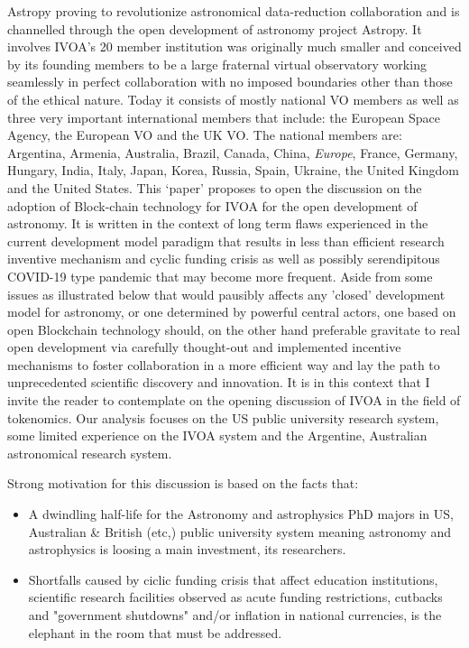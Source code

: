 \documentclass[final,5p,times,twocolumn,authoryear]{elsarticle}
\begin{document}
Astropy proving to revolutionize astronomical data-reduction collaboration and is channelled through the open development of astronomy project Astropy. It involves IVOA's 20 member institution was originally much smaller and conceived by its founding members to be a large fraternal virtual observatory working seamlessly in perfect collaboration with no imposed boundaries other than those of the ethical nature. Today it consists of mostly national VO members as well as three very important international members that include: the European Space Agency, the European VO and the UK VO. The national members are: Argentina, Armenia, Australia, Brazil, Canada, China, \textit{Europe}, France, Germany, Hungary, India, Italy, Japan, Korea, Russia, Spain, Ukraine, the United Kingdom and the United States. This `paper' proposes to open the discussion on the adoption of Block-chain technology for IVOA for the open development of astronomy. It is written in the context of long term flaws experienced in the current development model paradigm that results in less than efficient research inventive mechanism and cyclic funding crisis as well as possibly serendipitous COVID-19 type pandemic that may become more frequent.
%
Aside from some issues as illustrated below that would pausibly affects any 'closed' development model for astronomy, or one determined by powerful central actors, one based on open Blockchain technology should, on the other hand preferable gravitate to real open development via carefully thought-out and implemented incentive mechanisms to foster collaboration in a more efficient way and lay the path to unprecedented scientific discovery and innovation. It is in this context that I invite the reader to contemplate on the opening discussion of IVOA in the field of tokenomics. 
%
Our analysis focuses on the US public university research system, some limited experience on the IVOA system and the Argentine, Australian astronomical research system. 
   
   Strong motivation for this discussion is based on the facts that:
   
\begin{itemize}
       \item A dwindling half-life for the Astronomy and astrophysics PhD majors in US, Australian \& British (etc,) public university system meaning astronomy and astrophysics is loosing a main investment, its researchers.  
       
       \item Shortfalls caused by ciclic funding crisis that affect education institutions, scientific research facilities observed as acute funding restrictions, cutbacks and "government shutdowns" and/or inflation in national currencies, is the elephant in the room that must be addressed.
\end{itemize}
       
\end{document}
